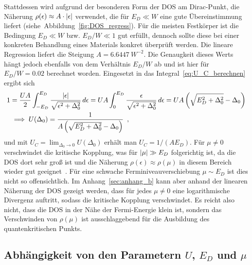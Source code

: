 Stattdessen wird aufgrund der besonderen Form der DOS am Dirac-Punkt, die Näherung $\rho(\epsilon) \approx A \cdot \abs{\epsilon}$ verwendet, die für $E_D \ll W$ eine gute Übereinstimmung liefert (siehe~Abbildung~\ref{fig:DOS_regress}).
Für die meisten Festkörper ist die Bedingung $E_D \ll W$ bzw. $E_D/W \ll 1$ gut erfüllt, dennoch sollte diese bei einer konkreten Behandlung eines Materials konkret überprüft werden.
Die lineare Regression liefert die Steigung $A = \qty{6.6447}{W^{-2}}$.
Die Genaugkeit dieses Werts hängt jedoch ebenfalls von dem Verhältnis $E_D/W$ ab und ist hier für $E_D/W = 0.02$ berechnet worden.
Eingesetzt in das Integral~\eqref{eq:U_C_berechnen} ergibt sich 
\begin{align}
    1 &= \frac{UA}{2} \int_{-E_D}^{E_D} \frac{\abs{\epsilon}}{\sqrt{\epsilon^2 + \Delta_0^2}} \, d\epsilon = UA \int_{0}^{E_D} \frac{\epsilon}{\sqrt{\epsilon^2 + \Delta_0^2}} \, d\epsilon = UA\left(\sqrt{E_D^2 + \Delta_0^2} - \Delta_0\right) \\
    &\implies U(\Delta_0) = \frac{1}{A\left(\sqrt{E_D^2 + \Delta_0^2} - \Delta_0\right)}~\label{eq:U_C} \, ,
\end{align}
und mit $U_C = \lim_{\Delta_0 \rightarrow 0} U(\Delta_0)$ erhält man $U_C = 1/(AE_D)$. 
Für $\mu \neq 0$ verschwindet die kritische Kopplung, was für $\abs{\mu} \gg E_D$ folgerichtig ist, da die DOS dort sehr groß ist und die Näherung $\rho(\epsilon) \approx \rho(\mu)$ in diesem Bereich wieder gut geeignet~\cite{czycholl_theoretische_2017}.
Für eine schwache Ferminiveauverschiebung $\mu \sim E_D$ ist dies nicht so offensichtlich.
Im Anhang~\ref{sec:anhang_b} kann aber anhand der linearen Näherung der DOS gezeigt werden, dass für jedes $\mu \neq 0$ eine logarithmische Divergenz auftritt, sodass die kritische Kopplung verschwindet.
Es reicht also nicht, dass die DOS in der Nähe der Fermi-Energie klein ist, sondern das Verschwinden von $\rho(\mu)$ ist ausschlaggebend für die Ausbildung des quantenkritischen Punkts.




















\subsection{Abhängigkeit von den Parametern \texorpdfstring{$U$, $E_D$ und $\mu$}{U, E_D und mu}}

